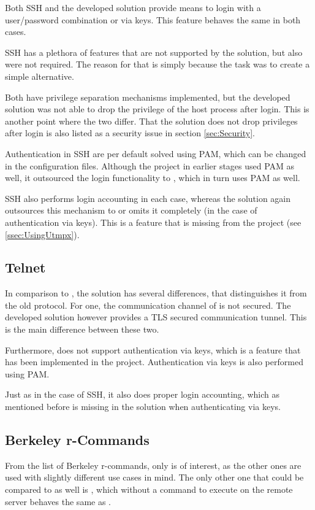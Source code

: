 \documentclass[10pt,a4paper,titlepage,twoside,english,final]{zhawreprt}
\begin{document}
Both \gls{SSH} and the developed solution provide means to login with a user/password combination or via keys.
This feature behaves the same in both cases.

\gls{SSH} has a plethora of features that are not supported by the solution, but also were not required.
The reason for that is simply because the task was to create a simple alternative.

Both have privilege separation mechanisms implemented, but the developed solution was not able to drop the privilege of the host process after \gls{login}.
This is another point where the two differ.
That the solution does not drop privileges after \gls{login} is also listed as a security issue in section \ref{sec:Security}.

Authentication in \gls{SSH} are per default solved using \gls{PAM}, which can be changed in the configuration files.
Although the project in earlier stages used \gls{PAM} as well, it outsourced the \gls{login} functionality to \cite{login}, which in turn uses \gls{PAM} as well.

\gls{SSH} also performs \gls{login} accounting in each case, whereas the solution again outsources this mechanism to \cite{login} or omits it completely (in the case of authentication via keys).
This is a feature that is missing from the project (see \ref{ssec:UsingUtmpx}).

\subsection{Telnet}\label{ssec:CompTelnet}
In comparison to \cite{telnet}, the solution has several differences, that distinguishes it from the old protocol.
For one, the communication channel of \cite{telnet} is not secured.
The developed solution however provides a \gls{TLS} secured communication tunnel.
This is the main difference between these two.

Furthermore, \cite{telnet} does not support authentication via keys, which is a feature that has been implemented in the project.
Authentication via keys is also performed using \gls{PAM}.

Just as in the case of \gls{SSH}, it also does proper \gls{login} accounting, which as mentioned before is missing in the solution when authenticating via keys.

\subsection{Berkeley r-Commands}\label{ssec:BerkeleyRCommands}
From the list of Berkeley r-commands, only \cite{rlogin} is of interest, as the other ones are used with slightly different use cases in mind.
The only other one that could be compared to as well is \cite{rsh}, which without a command to execute on the remote server behaves the same as \cite{rlogin}.
\end{document}
